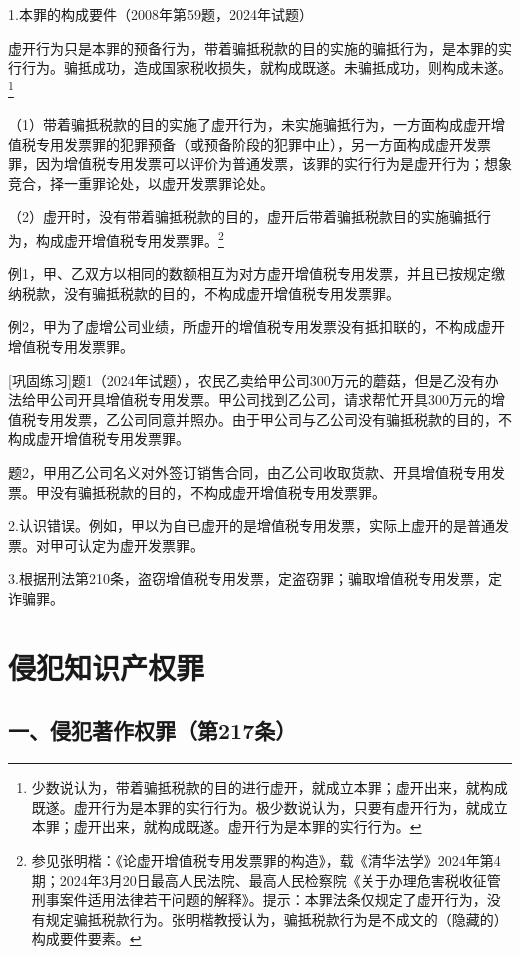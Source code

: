 1.本罪的构成要件（2008年第59题，2024年试题）

虚开行为只是本罪的预备行为，带着骗抵税款的目的实施的骗抵行为，是本罪的实行行为。骗抵成功，造成国家税收损失，就构成既遂。未骗抵成功，则构成未遂。\footnote{少数说认为，带着骗抵税款的目的进行虚开，就成立本罪；虚开出来，就构成既遂。虚开行为是本罪的实行行为。极少数说认为，只要有虚开行为，就成立本罪；虚开出来，就构成既遂。虚开行为是本罪的实行行为。}

（1）带着骗抵税款的目的实施了虚开行为，未实施骗抵行为，一方面构成虚开增值税专用发票罪的犯罪预备（或预备阶段的犯罪中止），另一方面构成虚开发票罪，因为增值税专用发票可以评价为普通发票，该罪的实行行为是虚开行为；想象竞合，择一重罪论处，以虚开发票罪论处。

（2）虚开时，没有带着骗抵税款的目的，虚开后带着骗抵税款目的实施骗抵行为，构成虚开增值税专用发票罪。\footnote{参见张明楷：《论虚开增值税专用发票罪的构造》，载《清华法学》2024年第4期；2024年3月20日最高人民法院、最高人民检察院《关于办理危害税收征管刑事案件适用法律若干问题的解释》。提示：本罪法条仅规定了虚开行为，没有规定骗抵税款行为。张明楷教授认为，骗抵税款行为是不成文的（隐藏的）构成要件要素。}

例1，甲、乙双方以相同的数额相互为对方虚开增值税专用发票，并且已按规定缴纳税款，没有骗抵税款的目的，不构成虚开增值税专用发票罪。

例2，甲为了虚增公司业绩，所虚开的增值税专用发票没有抵扣联的，不构成虚开增值税专用发票罪。

[巩固练习]题1（2024年试题），农民乙卖给甲公司300万元的蘑菇，但是乙没有办法给甲公司开具增值税专用发票。甲公司找到乙公司，请求帮忙开具300万元的增值税专用发票，乙公司同意并照办。由于甲公司与乙公司没有骗抵税款的目的，不构成虚开增值税专用发票罪。

题2，甲用乙公司名义对外签订销售合同，由乙公司收取货款、开具增值税专用发票。甲没有骗抵税款的目的，不构成虚开增值税专用发票罪。

2.认识错误。例如，甲以为自已虚开的是增值税专用发票，实际上虚开的是普通发票。对甲可认定为虚开发票罪。

3.根据刑法第210条，盗窃增值税专用发票，定盗窃罪；骗取增值税专用发票，定诈骗罪。

\section{侵犯知识产权罪}

\subsection*{一、侵犯著作权罪（第217条）}

